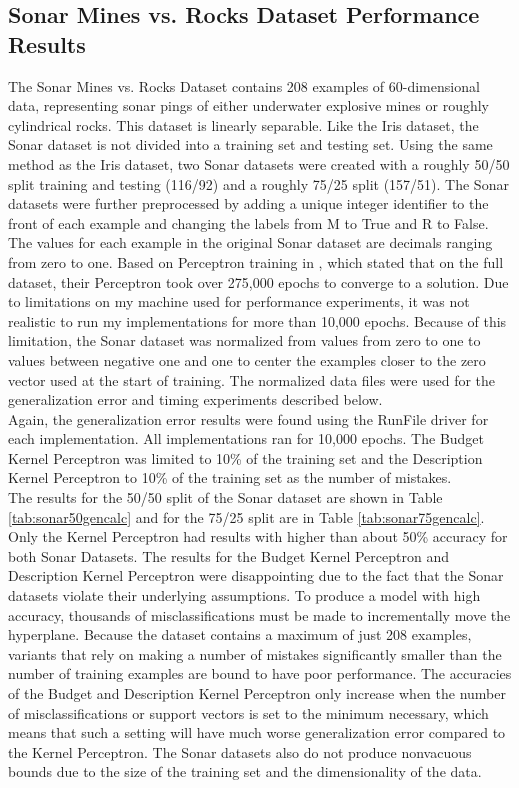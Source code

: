 \subsection{Sonar Mines vs. Rocks Dataset Performance Results}\label{SonarResults}
The Sonar Mines vs. Rocks Dataset contains 208 examples of 60-dimensional data, representing sonar pings of either underwater explosive mines or roughly cylindrical rocks. This dataset is linearly separable. Like the Iris dataset, the Sonar dataset is not divided into a training set and testing set. Using the same method as the Iris dataset, two Sonar datasets were created with a roughly 50/50 split training and testing (116/92) and a roughly  75/25 split (157/51). The Sonar datasets were further preprocessed by adding a unique integer identifier to the front of each example and changing the labels from M to True and R to False. 
\\The values for each example in the original Sonar dataset are decimals ranging from zero to one. Based on Perceptron training in \cite{MGS17}, which stated that on the full dataset, their Perceptron took over 275,000 epochs to converge to a solution. Due to limitations on my machine used for performance experiments, it was not realistic to run my implementations for more than 10,000 epochs. Because of this limitation, the Sonar dataset was normalized from values from zero to one to values between negative one and one to center the examples closer to the zero vector used at the start of training. The normalized data files were used for the generalization error and timing experiments described below. 
\\Again, the generalization error results were found using the RunFile driver for each implementation. All implementations ran for 10,000 epochs. The Budget Kernel Perceptron was limited to 10\% of the training set and the Description Kernel Perceptron to 10\% of the training set as the number of mistakes.
\\The results for the 50/50 split of the Sonar dataset are shown in Table \ref{tab:sonar50gencalc} and for the 75/25 split are in Table \ref{tab:sonar75gencalc}. Only the Kernel Perceptron had results with higher than about 50\% accuracy for both Sonar Datasets. The results for the Budget Kernel Perceptron and Description Kernel Perceptron were disappointing due to the fact that the Sonar datasets violate their underlying assumptions. To produce a model with high accuracy, thousands of misclassifications must be made to incrementally move the hyperplane. Because the dataset contains a maximum of just 208 examples, variants that rely on making a number of mistakes significantly smaller than the number of training examples are bound to have poor performance. The accuracies of the Budget and Description Kernel Perceptron only increase when the number of misclassifications or support vectors is set to the minimum necessary, which means that such a setting will have much worse generalization error compared to the Kernel Perceptron. The Sonar datasets also do not produce nonvacuous bounds due to the size of the training set and the dimensionality of the data.

